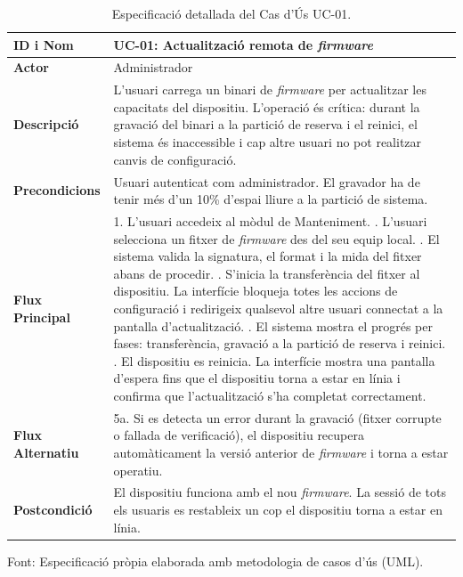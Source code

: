 \begin{table}[htbp]
  \centering
  \small
  \begin{tabular}{|l|p{10cm}|}
    \hline
    \rowcolor{backcolour} \textbf{ID i Nom} & \textbf{UC-01: Actualització remota de \textit{firmware}}                                                                               \\ \hline
    \textbf{Actor}                          & Administrador                                                                                                                  \\ \hline
    \textbf{Descripció}                     & L'usuari carrega un binari de \textit{firmware} per actualitzar les capacitats del dispositiu. L'operació és crítica: durant la gravació del binari a la partició de reserva i el reinici, el sistema és inaccessible i cap altre usuari no pot realitzar canvis de configuració.                                                                                              \\ \hline
    \textbf{Precondicions}                  & Usuari autenticat com administrador. El gravador ha de tenir més d'un 10\% d'espai lliure a la partició de sistema.            \\ \hline
    \textbf{Flux Principal}                 &
    1. L'usuari accedeix al mòdul de Manteniment. \newline
    2. L'usuari selecciona un fitxer de \textit{firmware} des del seu equip local. \newline
    3. El sistema valida la signatura, el format i la mida del fitxer abans de procedir. \newline
    4. S'inicia la transferència del fitxer al dispositiu. La interfície bloqueja totes les accions de configuració i redirigeix qualsevol altre usuari connectat a la pantalla d'actualització. \newline
    5. El sistema mostra el progrés per fases: transferència, gravació a la partició de reserva i reinici. \newline
    6. El dispositiu es reinicia. La interfície mostra una pantalla d'espera fins que el dispositiu torna a estar en línia i confirma que l'actualització s'ha completat correctament.  \\ \hline
    \textbf{Flux Alternatiu}                &
    5a. Si es detecta un error durant la gravació (fitxer corrupte o fallada de verificació), el dispositiu recupera automàticament la versió anterior de \textit{firmware} i torna a estar operatiu. \\ \hline
    \textbf{Postcondició}                   & El dispositiu funciona amb el nou \textit{firmware}. La sessió de tots els usuaris es restableix un cop el dispositiu torna a estar en línia.                                               \\ \hline
  \end{tabular}
  \caption{Especificació detallada del Cas d'Ús UC-01.}
  \label{tab:uc_firmware}
\par\smallskip
\small Font: Especificació pròpia elaborada amb metodologia de casos d'ús (UML).
\end{table}


